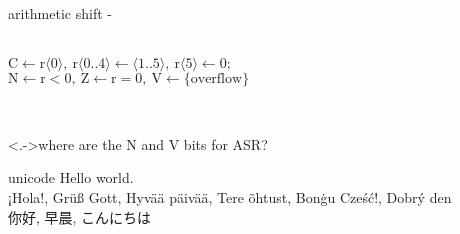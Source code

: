 \documentclass[10pt,t,svgnames]{beamer}
\makeatletter
\newlength\tightleftmargin{}
\newlength\diffleftmargin{}
\providecommand{\nextline}{
  \setlength\labelwidth{\tightleftmargin}
  \setlength\leftmargin{\tightleftmargin}
  \advance\linewidth\diffleftmargin{}
  \advance\@totalleftmargin-\diffleftmargin{}
  \parshape\@ne\@totalleftmargin\linewidth{}
  \setlength\itemsep{1.5ex}
}
\let\origdescription\description
\let\endorigdescription\enddescription
\renewenvironment{description}{\origdescription\nextline}{\endorigdescription}
\makeatother
\begin{document}
  \begin{frame}{arithmetic shift}
    \begin{description}
      \item[arithmetic shift left (asl)]\hfill \\
        $\mbox{C}\leftarrow\mbox{r}\langle0\rangle,~\mbox{r}\langle0..4\rangle\leftarrow\langle1..5\rangle,~\mbox{r}\langle5\rangle\leftarrow0;$\\
        $\mbox{N}\leftarrow\mbox{r}<0,~\mbox{Z}\leftarrow\mbox{r}=0,~\mbox{V}\leftarrow\{\mbox{overflow}\}$
      \item[arithmetic shift right (asr)]\hfill\\
    \end{description}

    \note[item]<.->{where are the N and V bits for ASR?}
  \end{frame}

  \begin{frame}{unicode}
    Hello world.\\
    ¡Hola!, Grüß Gott, Hyvää päivää, Tere õhtust, Bonġu Cześć!, Dobrý den\\
    { 你好, 早晨, こんにちは}
  \end{frame}

\end{document}
